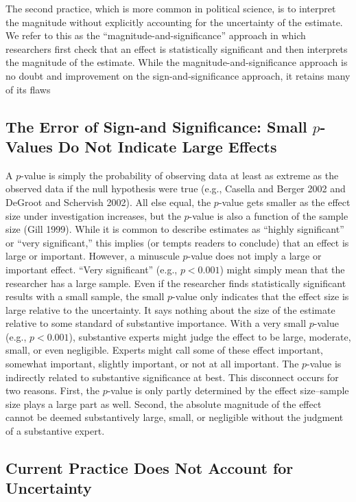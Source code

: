 \documentclass[12pt]{article}
\begin{document}
The second practice, which is more common in political science, is to interpret the magnitude without explicitly accounting for the uncertainty of the estimate. We refer to this as the ``magnitude-and-significance'' approach in which researchers first check that an effect is statistically significant and then interprets the magnitude of the estimate. While the magnitude-and-significance approach is no doubt and improvement on the sign-and-significance approach, it retains many of its flaws

\subsection*{The Error of Sign-and Significance: Small $p$-Values Do Not Indicate Large Effects}

A $p$-value is simply the probability of observing data at least as extreme as the observed data if the null hypothesis were true (e.g., Casella and Berger 2002 and DeGroot and Schervish 2002). All else equal, the $p$-value gets smaller as the effect size under investigation increases, but the $p$-value is also a function of the sample size (Gill 1999). While it is common to describe estimates as ``highly significant'' or ``very significant,'' this implies (or tempts readers to conclude) that an effect is large or important. However, a minuscule $p$-value does not imply a large or important effect. ``Very significant'' (e.g., $p < 0.001$) might simply mean that the researcher has a large sample. Even if the researcher finds statistically significant results with a small sample, the small $p$-value only indicates that the effect size is large relative to the uncertainty. It says nothing about the size of the estimate relative to some standard of substantive importance. With a very small $p$-value (e.g., $p < 0.001$), substantive experts might judge the effect to be large, moderate, small, or even negligible. Experts might call some of these effect important, somewhat important, slightly important, or not at all important. The $p$-value is indirectly related to substantive significance at best. This disconnect occurs for two reasons. First, the $p$-value is only partly determined by the effect size--sample size plays a large part as well. Second, the absolute magnitude of the effect cannot be deemed substantively large, small, or negligible without the judgment of a substantive expert.

\subsection*{Current Practice Does Not Account for Uncertainty}
\end{document}

